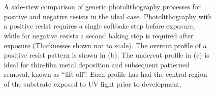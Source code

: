 \documentclass[
  a4paper,
]{scrbook}
\begin{document}
\begin{figure}
\begin{minipage}[t]{0.03\linewidth}
{

}

\end{minipage}%
%
\begin{minipage}[t]{0.01\linewidth}

{\centering 

~

}

\end{minipage}%
%
\begin{minipage}[t]{0.45\linewidth}

{\centering 


}

\end{minipage}%
%
\begin{minipage}[t]{0.01\linewidth}

{\centering 

~

}

\end{minipage}%

\caption{\label{fig-photolithography-profiles}A side-view comparison of
generic photolithography processes for positive and negative resists in
the ideal case. Photolithography with a positive resist requires a
single softbake step before exposure, while for negative resists a
second baking step is required after exposure (Thicknesses shown not to
scale). The overcut profile of a positive resist pattern is shown in
(b). The undercut profile in (c) is ideal for thin-film metal deposition
and subsequent patterned removal, known as ``lift-off''. Each profile
has had the central region of the substrate exposed to UV light prior to
development.}

\end{figure}
\end{document}
